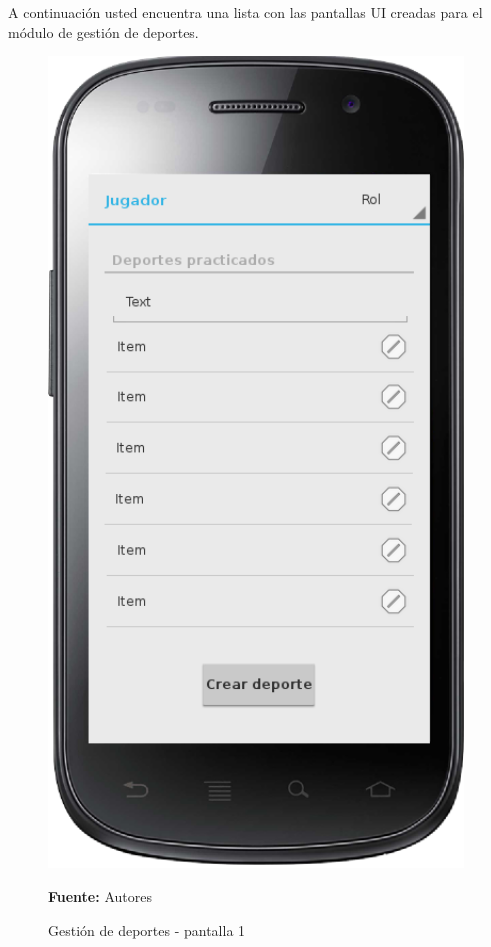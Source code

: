 A continuación usted encuentra una lista con las pantallas UI creadas para el módulo de gestión de deportes.

\begin{figure}[!htb]
  \begin{center}
    \includegraphics[width=11cm]{./imagenes/UI/Deportes/gestion_deportes_1.png}
    \caption{Gestión de deportes - pantalla 1}
    \label{fig:gestion_deportes_1}
    \textbf{Fuente:}  Autores
  \end{center}
\end{figure}

